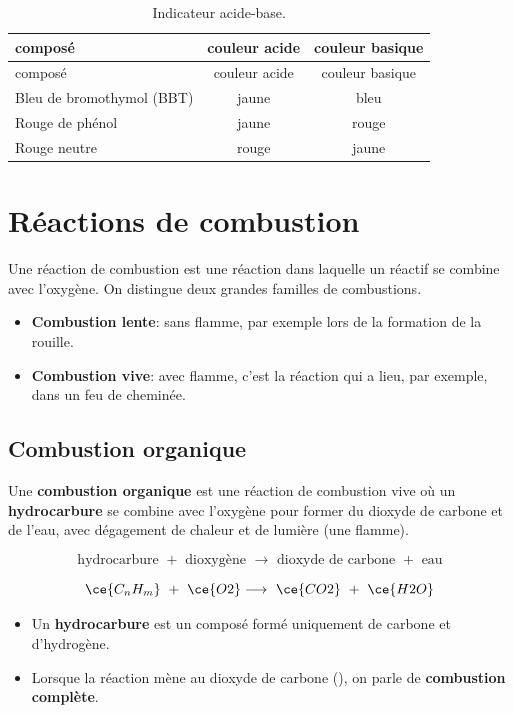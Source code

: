 \documentclass[
  11pt,
  a4paper,
  openany]{book}
\providecommand{\tightlist}{%
  \setlength{\itemsep}{0pt}\setlength{\parskip}{0pt}}
\begin{document}
\begin{longtable}[]{@{}lcc@{}}
\caption{\label{tab:indicateur-acide-base} Indicateur acide-base.}\tabularnewline
\toprule\noalign{}
composé & couleur acide & couleur basique \\
\midrule\noalign{}
\endfirsthead
\toprule\noalign{}
composé & couleur acide & couleur basique \\
\midrule\noalign{}
\endhead
\bottomrule\noalign{}
\endlastfoot
Bleu de bromothymol (BBT) & jaune & bleu \\
Rouge de phénol & jaune & rouge \\
Rouge neutre & rouge & jaune \\
\end{longtable}

\section{Réactions de combustion}\label{ruxe9actions-de-combustion}

Une réaction de combustion est une réaction dans laquelle un réactif se combine avec l'oxygène. On distingue deux grandes familles de combustions.

\begin{itemize}
\tightlist
\item
  \textbf{Combustion lente}: sans flamme, par exemple lors de la formation de la rouille.
\item
  \textbf{Combustion vive}: avec flamme, c'est la réaction qui a lieu, par exemple, dans un feu de cheminée.
\end{itemize}

\subsection{Combustion organique}\label{combustion-organique}

Une \textbf{combustion organique} est une réaction de combustion vive où un \textbf{hydrocarbure} se combine avec l'oxygène pour former du dioxyde de carbone et de l'eau, avec dégagement de chaleur et de lumière (une flamme).

\[ \text{hydrocarbure } + \text{ dioxygène } \longrightarrow \text{ dioxyde de carbone } + \text{ eau} \]

\[ \ce{C_{n}H_{m}}\ +\ \ce{O2} \longrightarrow\ \ce{CO2}\ +\ \ce{H2O} \]

\begin{itemize}
\tightlist
\item
  Un \textbf{hydrocarbure} est un composé formé uniquement de carbone et d'hydrogène.
\item
  Lorsque la réaction mène au dioxyde de carbone (), on parle de \textbf{combustion complète}.
\end{itemize}
\end{document}
